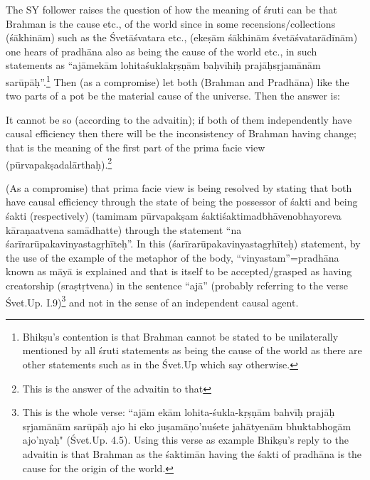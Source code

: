 The SY follower raises the question of how the meaning of śruti can be that Brahman is the cause etc., of the world since in some recensions/collections (śākhinām) such as the Śvetāśvatara etc., (ekeṣām śākhinām śvetāśvatarādīnām) one hears of pradhāna also as being the cause of the world etc., in such statements as “ajāmekām lohitaśuklakṛṣṇām baḥvīhiḥ prajāḥsṛjamānām sarūpāḥ”.\footnote{Bhikṣu’s contention is that Brahman cannot be stated to be unilaterally mentioned by all śruti statements as being the cause of the world as there are other statements such as in the Śvet.Up which say otherwise.} Then (as a compromise) let both  (Brahman and Pradhāna) like the two parts of a pot be the material cause of the universe. Then the answer is:

 It cannot be so (according to the advaitin); if both of them independently have causal efficiency then there will be the inconsistency of Brahman having change; that is the meaning of the first part of the prima facie view (pūrvapakṣadalārthaḥ).\footnote{This is the answer of the advaitin to that }
 
(As a compromise) that prima facie view is being resolved by stating that both have causal efficiency through the state of being the possessor of śakti and being śakti (respectively) (tamimam pūrvapakṣam śaktiśaktimadbhāvenobhayoreva kāraṇaatvena samādhatte)  through the statement “na śarīrarūpakavinyastagṛhīteḥ”.  In this (śarīrarūpakavin\-yastagṛhīteḥ) statement, by the use of the example of the metaphor of the body, “vinyastam”=pradhāna known as māyā is explained and that is itself to be accepted/grasped as having creatorship (sraṣtṛtvena) in the sentence “ajā” (probably referring to the verse Śvet.Up. I.9)\footnote{This is the whole verse: “ajām ekām lohita-śukla-kṛṣṇām bahvīḥ prajāḥ sṛjamānām sarūpāḥ ajo hi eko juṣamāṇo’nuśete jahātyenām bhuktabhogām ajo’nyaḥ" (Śvet.Up. 4.5).  Using this verse as example Bhikṣu’s reply to the advaitin is that Brahman as the śaktimān having the śakti of pradhāna is the cause for the origin of the world.} and not in the sense of an independent causal agent. 

\newpage


